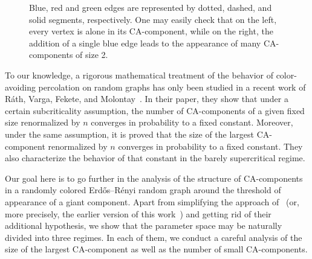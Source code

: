 \documentclass[AHL,Unicode,longabstracts,published]{cedram}
\begin{document}
\begin{figure}
\caption{Blue, red and green edges are represented by dotted, dashed, and solid segments, respectively. One may easily check that on the left, every vertex is alone in its CA-component, while on the right, the addition of a single blue edge leads to the appearance of many CA-components of size 2.}\label{fig 1}
\end{figure}

To our knowledge, a rigorous mathematical treatment of the behavior of color-avoiding percolation on random graphs has only been studied in a recent work of Ráth, Varga, Fekete, and Molontay~\cite{RVFM22}. In their paper, they show that under a certain subcriticality assumption, the number of CA-components of a given fixed size renormalized by $n$ converges in probability to a fixed constant. Moreover, under the same assumption, it is proved that the size of the largest CA-component renormalized by $n$ converges in probability to a fixed constant. They also characterize the behavior of that constant in the barely supercritical regime.

Our goal here is to go further in the analysis of the structure of CA-components in a randomly colored Erd\H{o}s--Rényi random graph around the threshold of appearance of a giant component. Apart from simplifying the approach of~\cite{RVFM22} (or, more precisely, the earlier version of this work~\cite{RVFM22.0}) and getting rid of their additional hypothesis, we show that the parameter space may be naturally divided into three regimes. In each of them, we conduct a careful analysis of the size of the largest CA-component as well as the number of small CA-components.
\end{document}
